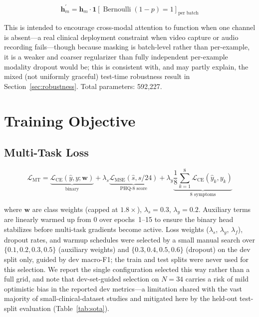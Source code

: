 \documentclass[5p,twocolumn]{elsarticle}
\begin{document}
\begin{equation}
\mathbf{h}_m^\prime =
  \mathbf{h}_m \cdot \mathbf{1}[\operatorname{Bernoulli}(1-p)=1]_{\text{per batch}}
\label{eq:moddrop}
\end{equation}

This is intended to encourage cross-modal attention to function when
one channel is absent---a real clinical deployment constraint when
video capture or audio recording fails---though because masking is
batch-level rather than per-example, it is a weaker and coarser
regularizer than fully independent per-example modality dropout would
be; this is consistent with, and may partly explain, the mixed (not
uniformly graceful) test-time robustness result in
Section~\ref{sec:robustness}. Total parameters: 592,227.

\section{Training Objective}
\label{sec:training}

\subsection{Multi-Task Loss}

\begin{equation}
\mathcal{L}_\text{MT} =
  \underbrace{\mathcal{L}_\text{CE}(\hat{y},y;\mathbf{w})}_{\text{binary}}
  + \lambda_s\!\underbrace{\mathcal{L}_\text{MSE}(\hat{s},s/24)}_{\text{PHQ-8 score}}
  + \lambda_y\!\underbrace{\frac{1}{8}\sum_{k=1}^{8}
    \mathcal{L}_\text{CE}(\hat{y}_k,y_k)}_{\text{8 symptoms}}
\label{eq:mt_loss}
\end{equation}

where $\mathbf{w}$ are class weights (capped at $1.8\times$),
$\lambda_s=0.3$, $\lambda_y=0.2$. Auxiliary terms are linearly
warmed up from 0 over epochs~1--15 to ensure the binary head
stabilizes before multi-task gradients become active. Loss weights
($\lambda_s$, $\lambda_y$, $\lambda_f$), dropout rates, and warmup
schedules were selected by a small manual search over
$\{0.1,0.2,0.3,0.5\}$ (auxiliary weights) and
$\{0.3,0.4,0.5,0.6\}$ (dropout) on the dev split only, guided by
dev macro-F1; the train and test splits were never used for this
selection. We report the single configuration selected this way
rather than a full grid, and note that dev-set-guided selection
on $N{=}34$ carries a risk of mild optimistic bias in the reported
dev metrics---a limitation shared with the vast majority of
small-clinical-dataset studies and mitigated here by the
held-out test-split evaluation (Table~\ref{tab:sota}).
\end{document}
